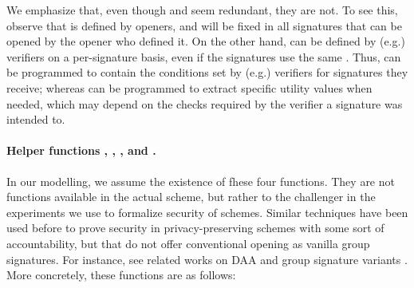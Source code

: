 We emphasize that, even though \finsp and \feval seem redundant, they are not.
To see this, observe that \finsp is defined by openers, and will be fixed in
all signatures that can be opened by the opener who defined it. On the other
hand, \feval can be defined by (e.g.) verifiers on a per-signature basis, even
if the signatures use the same \finsp. Thus, \feval can be programmed to contain
the conditions set by (e.g.) verifiers for signatures they receive; whereas
\finsp can be programmed to extract specific utility values when needed, which
may depend on the checks required by the verifier a signature was intended to.

\paragraph{Helper functions \ExtractIssue, \ExtractSign, \IdentifyCred, and
  \IdentifyUK.} In our modelling, we assume the existence of fhese four
functions. They are not
functions available in the actual scheme, but rather to the challenger in the
experiments we use to formalize security of \UAS schemes. Similar techniques
have been used before to prove security in privacy-preserving schemes with some
sort of accountability, but that do not offer conventional opening as vanilla
group signatures. For instance, see related works on DAA \cite{bfg+11,cdl16} and
group signature variants \cite{dl21,fgl21,gl19,lnpy21}. More concretely, these
functions are as follows:

